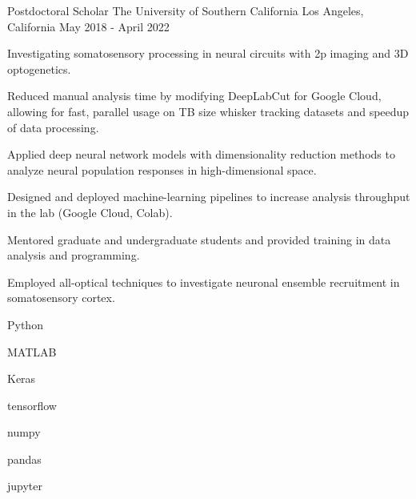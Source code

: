 \begin{cventries}
  \cventry%
    {Postdoctoral Scholar} %
    {The University of Southern California} %
    {Los Angeles, California} %
    {May 2018 \-- April 2022} %
    {%
      \begin{cvsentence}Investigating somatosensory processing in neural circuits with 2p imaging and 3D optogenetics.\end{cvsentence}
      \begin{cvitems} %
        \item {Reduced manual analysis time by modifying DeepLabCut for Google Cloud, allowing for fast, parallel usage on TB size whisker tracking datasets and speedup of data processing.}
        \item {Applied deep neural network models with dimensionality reduction methods to analyze neural population responses in high-dimensional space.}
        \item {Designed and deployed machine-learning pipelines to increase analysis throughput in the lab (Google Cloud, Colab).}
        \item {Mentored graduate and undergraduate students and provided training in data analysis and programming.}
        \item {Employed all-optical techniques to investigate neuronal ensemble recruitment in somatosensory cortex.}
      \end{cvitems}
    }
    \begin{cventryskills}
      \item Python
      \item MATLAB
      \item Keras
      \item tensorflow
      \item numpy
      \item pandas
      \item jupyter
    \end{cventryskills}


\end{cventries}
